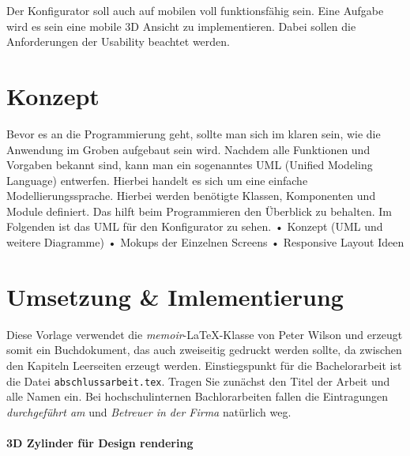 Der Konfigurator soll auch auf mobilen voll funktionsfähig sein. Eine Aufgabe wird es sein eine mobile 3D Ansicht zu implementieren. Dabei sollen die Anforderungen der Usability beachtet werden.
%
%
%
%
%
\section{Konzept}
\label{sec:konzept}
%
Bevor es an die Programmierung geht, sollte man sich im klaren sein, wie die Anwendung im Groben aufgebaut sein wird. Nachdem alle Funktionen und Vorgaben bekannt sind, kann man ein sogenanntes UML (Unified Modeling Language) entwerfen. Hierbei handelt es sich um eine einfache Modellierungssprache. Hierbei werden benötigte Klassen, Komponenten und Module definiert. Das hilft beim Programmieren den Überblick zu behalten. Im Folgenden  ist das UML für den Konfigurator zu sehen.
• Konzept (UML und weitere Diagramme)
• Mokups der Einzelnen Screens
• Responsive Layout Ideen \\
%
%
%
%
%
\section{Umsetzung \& Imlementierung}
\label{sec:umsetzung}
%
Diese Vorlage verwendet die \textit{memoir}-LaTeX-Klasse von Peter Wilson und erzeugt somit ein Buchdokument, das auch zweiseitig gedruckt werden sollte, da zwischen den Kapiteln Leerseiten erzeugt werden. Einstiegspunkt für die Bachelorarbeit ist die Datei \texttt{abschlussarbeit.tex}. Tragen Sie zunächst den Titel der Arbeit und alle Namen ein. Bei hochschulinternen Bachlorarbeiten fallen die Eintragungen \textit{durchgeführt am} und \textit{Betreuer in der Firma} natürlich weg. 
\paragraph{3D Zylinder für Design rendering}
